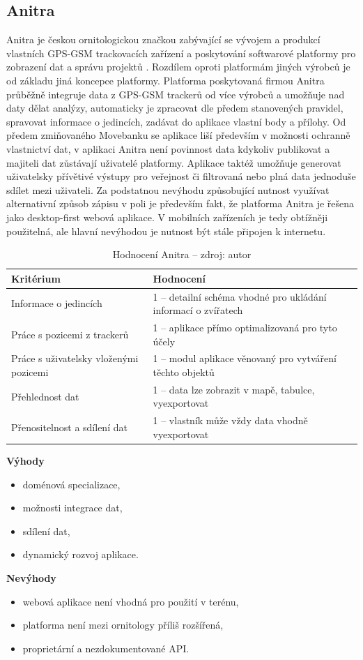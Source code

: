 \subsection{Anitra}

Anitra je českou ornitologickou značkou zabývající se vývojem a produkcí vlastních GPS-GSM trackovacích zařízení a poskytování softwarové platformy pro zobrazení dat a správu projektů \cite{krouzkovaniPtakuAnitra}. Rozdílem oproti platformám jiných výrobců je od základu jiná koncepce platformy. Platforma poskytovaná firmou Anitra průběžně integruje data z GPS-GSM trackerů od více výrobců a umožňuje nad daty dělat analýzy, automaticky je zpracovat dle předem stanovených pravidel, spravovat informace o jedincích, zadávat do aplikace vlastní body a přílohy. Od předem zmiňovaného Movebanku se aplikace liší především v možnosti ochranně vlastnictví dat, v aplikaci Anitra není povinnost data kdykoliv publikovat a majiteli dat zůstávají uživatelé platformy. Aplikace taktéž umožňuje generovat uživatelsky přívětivé výstupy pro veřejnost či filtrovaná nebo plná data jednoduše sdílet mezi uživateli. Za podstatnou nevýhodu způsobující nutnost využívat alternativní způsob zápisu v poli je především fakt, že platforma Anitra je řešena jako desktop-first webová aplikace. V mobilních zařízeních je tedy obtížněji použitelná, ale hlavní nevýhodou je nutnost být stále připojen k internetu.

\begin{table}[H]
	\begin{tabularx}{\textwidth}{ | X | X | }
		\hline			
		Kritérium                              & Hodnocení \\
		\hline			
		Informace o jedincích                  & 1 -- detailní schéma vhodné pro ukládání informací o zvířatech          \\
		\hline
		Práce s pozicemi z trackerů            & 1 -- aplikace přímo optimalizovaná pro tyto účely          \\
		\hline
		Práce s uživatelsky vloženými pozicemi & 1 -- modul aplikace věnovaný pro vytváření těchto objektů          \\
		\hline
		Přehlednost dat                        & 1 -- data lze zobrazit v mapě, tabulce, vyexportovat          \\
		\hline
		Přenositelnost a sdílení dat           & 1 -- vlastník může vždy data vhodně vyexportovat          \\
		\hline	
	\end{tabularx}
	\caption[Hodnocení Anitra]{Hodnocení Anitra -- zdroj: autor}
\end{table}
\textbf{Výhody}
\nolisttopbreak
\begin{itemize}
	\item doménová specializace,
	\item možnosti integrace dat,
	\item sdílení dat,
	\item dynamický rozvoj aplikace.
\end{itemize}

\textbf{Nevýhody}
\nolisttopbreak
\begin{itemize}
	\item webová aplikace není vhodná pro použití v terénu,
	\item platforma není mezi ornitology příliš rozšířená,
	\item proprietární a nezdokumentované API.
\end{itemize}

